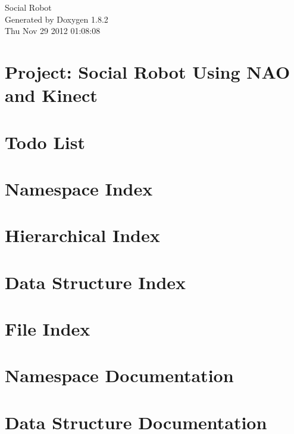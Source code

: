 \documentclass{book}
\begin{document}
\hypersetup{pageanchor=false,citecolor=blue}
\begin{titlepage}
\vspace*{7cm}
\begin{center}
{\Large Social Robot }\\
\vspace*{1cm}
{\large Generated by Doxygen 1.8.2}\\
\vspace*{0.5cm}
{\small Thu Nov 29 2012 01:08:08}\\
\end{center}
\end{titlepage}
\clearemptydoublepage
{}
\tableofcontents
\clearemptydoublepage
{}
\hypersetup{pageanchor=true,citecolor=blue}
\chapter{Project\-: Social Robot Using N\-A\-O and Kinect}
\label{index}\hypertarget{index}{}
\chapter{Todo List}
\label{todo}
\hypertarget{todo}{}

\chapter{Namespace Index}

\chapter{Hierarchical Index}

\chapter{Data Structure Index}

\chapter{File Index}

\chapter{Namespace Documentation}



\chapter{Data Structure Documentation}
























\end{document}
